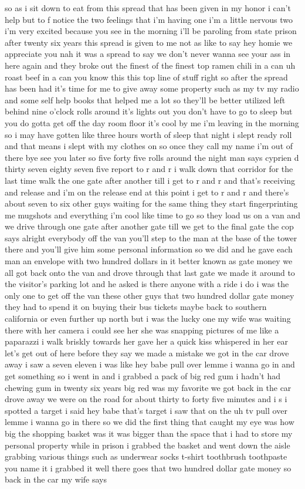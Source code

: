 so as i sit down to eat from this spread that has been given in my honor i can't help but to f notice the two feelings that i'm having one i'm a little nervous two i'm very excited because you see in the morning i'll be paroling from state prison after twenty six years this spread is given to me not as like to say hey homie we appreciate you nah it was a spread to say we don't never wanna see your ass in here again and they broke out the finest of the finest top ramen chili in a can uh roast beef in a can you know this this top line of stuff right so after the spread has been had it's time for me to give away some property such as my tv my radio and some self help books that helped me a lot so they'll be better utilized left behind nine o'clock rolls around it's lights out you don't have to go to sleep but you do gotta get off the day room floor it's cool by me i'm leaving in the morning so i may have gotten like three hours worth of sleep that night i slept ready roll and that means i slept with my clothes on so once they call my name i'm out of there bye see you later so five forty five rolls around the night man says cyprien d thirty seven eighty seven five report to r and r i walk down that corridor for the last time walk the one gate after another till i get to r and r and that's receiving and release and i'm on the release end at this point i get to r and r and there's about seven to six other guys waiting for the same thing they start fingerprinting me mugshots and everything i'm cool like time to go so they load us on a van and we drive through one gate after another gate till we get to the final gate the cop says alright everybody off the van you'll step to the man at the base of the tower there and you'll give him some personal information so we did and he gave each man an envelope with two hundred dollars in it better known as gate money we all got back onto the van and drove through that last gate we made it around to the visitor's parking lot and he asked is there anyone with a ride i do i was the only one to get off the van these other guys that two hundred dollar gate money they had to spend it on buying their bus tickets maybe back to southern california or even further up north but i was the lucky one my wife was waiting there with her camera i could see her she was snapping pictures of me like a paparazzi i walk briskly towards her gave her a quick kiss whispered in her ear let's get out of here before they say we made a mistake we got in the car drove away i saw a seven eleven i was like hey babe pull over lemme i wanna go in and get something so i went in and i grabbed a pack of big red gum i hadn't had chewing gum in twenty six years big red was my favorite we got back in the car drove away we were on the road for about thirty to forty five minutes and i s i spotted a target i said hey babe that's target i saw that on the uh tv pull over lemme i wanna go in there so we did the first thing that caught my eye was how big the shopping basket was it was bigger than the space that i had to store my personal property while in prison i grabbed the basket and went down the aisle grabbing various things such as underwear socks t-shirt toothbrush toothpaste you name it i grabbed it well there goes that two hundred dollar gate money so back in the car my wife says 